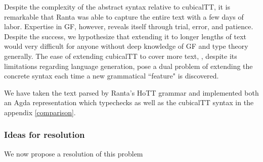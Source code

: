 Despite the complexity of the abstract syntax relative to cubicalTT, it is
remarkable that Ranta was able to capture the entire text with a few days of
labor. Expertise in GF, however, reveals itself through trial, error, and
patience. Despite the success, we hypothesize that extending it to longer
lengths of text would very difficult for anyone without deep knowledge of GF and
type theory generally. The ease of extending cubicalTT to cover more text,
, despite its limitations regarding language generation, pose a dual problem of
extending the concrete syntax each time a new grammatical ``feature" is discovered.

We have taken the text parsed by Ranta's HoTT grammar and implemented both an
Agda representation which typechecks as well as the cubicalTT syntax in the
appendix \ref{comparison}.

\subsubsection{Ideas for resolution}

We now propose a resolution of this problem 







